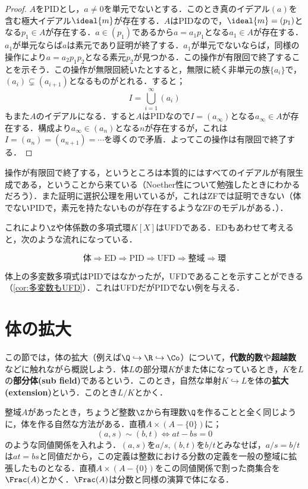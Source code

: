 \begin{proof}
	$A$をPIDとし，$a\neq0$を単元でないとする．このとき真のイデアル$(a)$を含む極大イデアル$\ideal{m}$が存在する．$A$はPIDなので，$\ideal{m}=(p_1)$となる$p_1\in A$が存在する．$a\in(p_1)$であるから$a=a_1p_1$となる$a_1\in A$が存在する．$a_1$が単元ならば$a$は素元であり証明が終了する．$a_1$が単元でないならば，同様の操作により$a=a_2p_1p_2$となる素元$p_2$が見つかる．この操作が有限回で終了することを示そう．この操作が無限回続いたとすると，無限に続く非単元の族$\{a_i\}$で，$(a_i)\subsetneq (a_{i+1})$となるものがとれる．すると；
	\[I=\bigcup_{i=1}^\infty (a_i)\]
	もまた$A$のイデアルになる．すると$A$はPIDなので$I=(a_\infty)$となる$a_\infty\in A$が存在する．構成より$a_\infty\in (a_n)$となる$n$が存在するが，これは$I=(a_n)=(a_{n+1})=\cdots$を導くので矛盾．よってこの操作は有限回で終了する．
\end{proof}

操作が有限回で終了する，というところは本質的にはすべてのイデアルが有限生成である，ということから来ている（Noether性について勉強したときにわかるだろう）．また証明に選択公理を用いているが，これはZFでは証明できない（体でないPIDで，素元を持たないものが存在するようなZFのモデルがある．\cite{Hodges1976}）．

これにより$\Z$や体係数の多項式環$K[X]$はUFDである．EDもあわせて考えると，次のような流れになっている．

\[\text{体}\Longrightarrow\text{ED}\Longrightarrow\text{PID}\Longrightarrow\text{UFD}\Longrightarrow\text{整域}\Longrightarrow\text{環}\]

体上の多変数多項式はPIDではなかったが，UFDであることを示すことができる（\ref{cor:多変数もUFD}）．これはUFDだがPIDでない例を与える．

\section{体の拡大}

この節では，体の拡大（例えば$\Q\hookrightarrow\R\hookrightarrow\Co$）について，\textbf{代数的数}や\textbf{超越数}などに触れながら概説しよう．体$L$の部分環$K$がまた体になっているとき，$K$を$L$の\textbf{部分体(sub field)}であるという．このとき，自然な単射$K\hookrightarrow L$を体の\textbf{拡大(extension)}という．このとき$L/K$とかく．

整域$A$があったとき，ちょうど整数$\Z$から有理数$\Q$を作ることと全く同じように，体を作る自然な方法がある．直積$A\times(A-\{0\})$に；
\[(a,s)\sim(b,t)\Longleftrightarrow at-bs=0\]
のような同値関係を入れよう．$(a,s)$を$a/s,(b,t)$を$b/t$とみなせば，$a/s=b/t$は$at=bs$と同値だから，この定義は整数における分数の定義を一般の整域に拡張したものとなる．直積$A\times(A-\{0\})$をこの同値関係で割った商集合を$\Frac (A)$とかく．$\Frac (A)$は分数と同様の演算で体になる．

